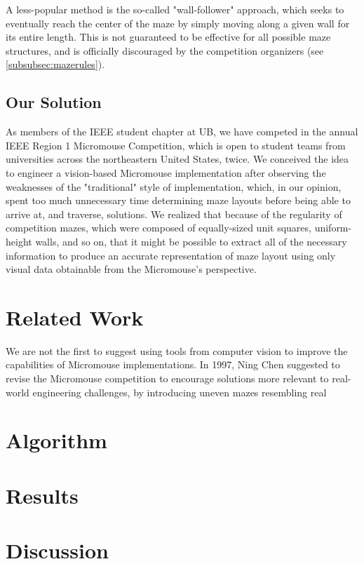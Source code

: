 \documentclass[10pt,twocolumn,letterpaper]{article}
\begin{document}
A less-popular method is the so-called "wall-follower" approach, which seeks to eventually reach the center of the maze
by simply moving along a given wall for its entire length.  This is not guaranteed to be effective for all possible maze
structures, and is officially discouraged by the competition organizers (see \textsection\ref{subsubsec:mazerules}).

\subsection{Our Solution}
\label{subsec:oursolution}
As members of the IEEE student chapter at UB, we have competed in the annual IEEE Region 1 Micromouse Competition, which
is open to student teams from universities across the northeastern United States, twice.  We conceived the idea to
engineer a vision-based Micromouse implementation after observing the weaknesses of the "traditional" style of
implementation, which, in our opinion, spent too much unnecessary time determining maze layouts before being able to
arrive at, and traverse, solutions.  We realized that because of the regularity of competition mazes, which were
composed of equally-sized unit squares, uniform-height walls, and so on, that it might be possible to extract all of the
necessary information to produce an accurate representation of maze layout using only visual data obtainable from the
Micromouse's perspective.

\section{Related Work}
\label{sec:relatedwork}
We are not the first to suggest using tools from computer vision to improve the capabilities of Micromouse
implementations.  In 1997, Ning Chen suggested to revise the Micromouse competition to encourage solutions more relevant to real-world engineering challenges, by introducing uneven mazes resembling real 


\section{Algorithm}
\label{sec:algorithm}
\section{Results}
\label{sec:results}
\section{Discussion}
\label{sec:discussion}
{\small


}
\end{document}
